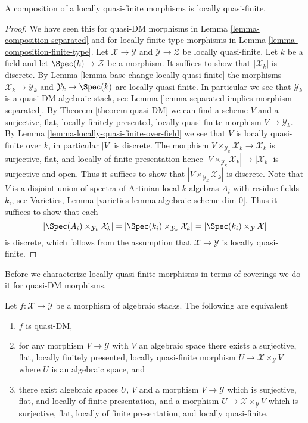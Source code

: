 \begin{lemma}
\label{lemma-composition-locally-quasi-finite}
A composition of a locally quasi-finite morphisms is locally quasi-finite.
\end{lemma}

\begin{proof}
We have seen this for quasi-DM morphisms in
Lemma \ref{lemma-composition-separated}
and for locally finite type morphisms in
Lemma \ref{lemma-composition-finite-type}.
Let $\mathcal{X} \to \mathcal{Y}$ and $\mathcal{Y} \to \mathcal{Z}$
be locally quasi-finite. Let $k$ be a field and let
$\Spec(k) \to \mathcal{Z}$ be a morphism.
It suffices to show that $|\mathcal{X}_k|$ is discrete. By
Lemma \ref{lemma-base-change-locally-quasi-finite}
the morphisms $\mathcal{X}_k \to \mathcal{Y}_k$
and $\mathcal{Y}_k \to \Spec(k)$ are locally quasi-finite.
In particular we see that $\mathcal{Y}_k$ is
a quasi-DM algebraic stack, see
Lemma \ref{lemma-separated-implies-morphism-separated}.
By
Theorem \ref{theorem-quasi-DM}
we can find a scheme $V$ and a surjective, flat, locally finitely presented,
locally quasi-finite morphism $V \to \mathcal{Y}_k$. By
Lemma \ref{lemma-locally-quasi-finite-over-field}
we see that $V$ is locally quasi-finite over $k$, in particular
$|V|$ is discrete. The morphism
$V \times_{\mathcal{Y}_k} \mathcal{X}_k \to \mathcal{X}_k$ is
surjective, flat, and locally of finite presentation hence
$|V \times_{\mathcal{Y}_k} \mathcal{X}_k| \to |\mathcal{X}_k|$
is surjective and open. Thus it suffices to show that
$|V \times_{\mathcal{Y}_k} \mathcal{X}_k|$ is discrete.
Note that $V$ is a disjoint union of spectra of Artinian local
$k$-algebras $A_i$ with residue fields $k_i$, see
Varieties, Lemma \ref{varieties-lemma-algebraic-scheme-dim-0}.
Thus it suffices to show that each
$$
|\Spec(A_i) \times_{\mathcal{Y}_k} \mathcal{X}_k| =
|\Spec(k_i) \times_{\mathcal{Y}_k} \mathcal{X}_k| =
|\Spec(k_i) \times_\mathcal{Y} \mathcal{X}|
$$
is discrete, which follows from the assumption that
$\mathcal{X} \to \mathcal{Y}$ is locally quasi-finite.
\end{proof}

\noindent
Before we characterize locally quasi-finite morphisms in terms of coverings
we do it for quasi-DM morphisms.

\begin{lemma}
\label{lemma-characterize-quasi-DM}
Let $f : \mathcal{X} \to \mathcal{Y}$ be a morphism of algebraic stacks.
The following are equivalent
\begin{enumerate}
\item $f$ is quasi-DM,
\item for any morphism $V \to \mathcal{Y}$ with $V$ an algebraic space
there exists a surjective, flat, locally finitely presented, locally
quasi-finite morphism $U \to \mathcal{X} \times_\mathcal{Y} V$ where
$U$ is an algebraic space, and
\item there exist algebraic spaces $U$, $V$ and a morphism
$V \to \mathcal{Y}$ which is surjective, flat, and
locally of finite presentation, and a morphism
$U \to \mathcal{X} \times_\mathcal{Y} V$ which is surjective, flat,
locally of finite presentation, and locally quasi-finite.
\end{enumerate}
\end{lemma}

